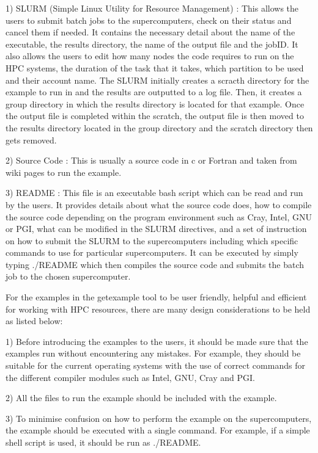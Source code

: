 \documentclass[journal]{IEEEtran}
\begin{document}
1) SLURM (Simple Linux Utility for Resource Management) : This allows the users to submit batch jobs to the supercomputers, check on their status and 
cancel them if needed. It contains the necessary detail about the name of the executable, the results directory, the name of the output file and 
the jobID. It also allows the users to edit how many nodes the code requires to run on the HPC systems, the duration of the task that it takes, which 
partition to be used and their account name. The SLURM initially creates a scracth directory for the example to run in and the results are outputted to 
a log file. Then, it creates a group directory in which the results directory is located for that example. Once the output file is completed within the 
scratch, the output file is then moved to the results directory located in the group directory and the scratch directory then gets removed.

2) Source Code : This is usually a source code in c or Fortran and taken from wiki pages to run the example.

3) README : This file is an executable bash script which can be read and run by the users. It provides details about what the source code does,
how to compile the source code depending on the program environment such as Cray, Intel, GNU or PGI, what can be modified in the SLURM directives, and 
a set of instruction on how to submit the SLURM to the supercomputers including which specific commands to use for particular supercomputers. It can be
executed by simply typing ./README which then compiles the source code and submits the batch job to the chosen supercomputer.

For the examples in the getexample tool to be user friendly, helpful and efficient for working with HPC resources, there are many design considerations 
to be held as listed below:

1) Before introducing the examples to the users, it should be made sure that the examples run  without encountering any mistakes. For example,
they should be suitable for the current operating systems with the use of correct commands for the different compiler modules such as Intel, GNU, Cray
and PGI. 

2) All the files to run the example should be included with the example.

3) To minimise confusion on how to perform the example on the supercomputers, the example should be executed with a single command. For example, 
if a simple shell script is used, it should be run as ./README.
\end{document}
